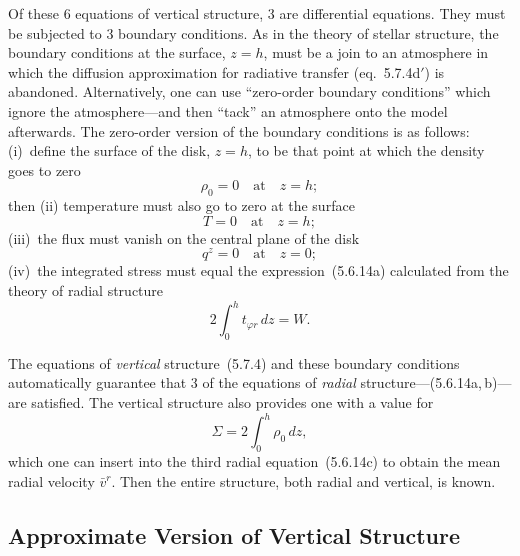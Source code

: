 Of these 6 equations of vertical structure, 3 are differential equations.  They
must be subjected to 3 boundary conditions.  As in the theory of stellar structure,
the boundary conditions at the surface, $z = h$, must be a join to an atmosphere in
which the diffusion approximation for radiative transfer (eq.~5.7.4d$'$) is abandoned.
Alternatively, one can use ``zero-order boundary conditions'' which ignore the
atmosphere---and then ``tack'' an atmosphere onto the model afterwards.  The
zero-order version of the boundary conditions is as follows: (i)~define the surface
of the disk, $z = h$, to be that point at which the density goes to zero
%
\begin{equation}
\tag{5.7.5a}
\rho_0 = 0 \quad \text{at} \quad z = h;
\end{equation}
%
then (ii) temperature must also go to zero at the surface
%
\begin{equation}
\tag{5.7.5b}
T = 0 \quad \text{at} \quad z = h;
\end{equation}
%
(iii)~the flux must vanish on the central plane of the disk
%
\begin{equation}
\tag{5.7.5c}
q^z = 0 \quad \text{at} \quad z = 0;
\end{equation}
%
(iv)~the integrated stress must equal the expression~(5.6.14a) calculated from the
theory of radial structure
%
\begin{equation}
\tag{5.7.5d}
2\int_0^h t_{\varphi r}\,dz = W.
\end{equation}

The equations of \textit{vertical} structure~(5.7.4) and these boundary conditions
automatically guarantee that 3 of the equations of \textit{radial} structure---(5.6.14a,\,b)---
are satisfied.  The vertical structure also provides one with a value for
%
\begin{equation}
\Sigma = 2\int_0^h \rho_0\,dz,
\end{equation}
%
which one can insert into the third radial equation~(5.6.14c) to obtain the mean
radial velocity $\bar{v}^r$.  Then the entire structure, both radial and vertical, is known.



\subsection{Approximate Version of Vertical Structure}
\label{sec:5.8}


